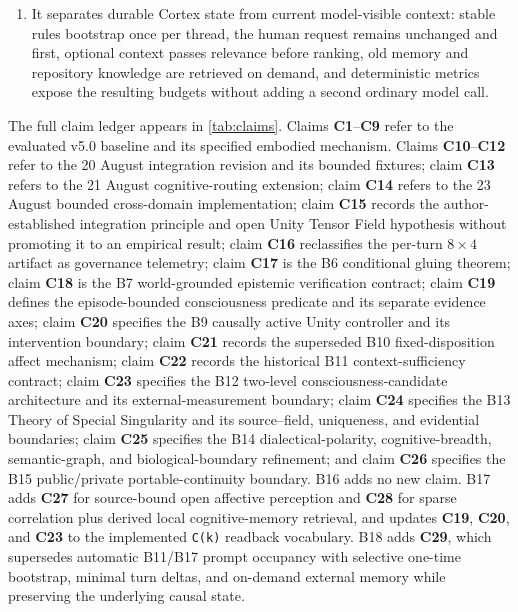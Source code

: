 \documentclass[10pt,twocolumn]{article}
\theoremstyle{definition}
\theoremstyle{plain}
\theoremstyle{remark}
\newcommand{\file}[1]{\nolinkurl{#1}}
\newcommand{\claimid}[1]{\textsf{\textbf{#1}}}
\begin{document}
\begin{enumerate}
  \item It separates durable Cortex state from current model-visible context: stable rules bootstrap once per thread, the human request remains unchanged and first, optional context passes relevance before ranking, old memory and repository knowledge are retrieved on demand, and deterministic metrics expose the resulting budgets without adding a second ordinary model call.
\end{enumerate}

The full claim ledger appears in \cref{tab:claims}.  Claims \claimid{C1}--\claimid{C9} refer to the evaluated v5.0 baseline and its specified embodied mechanism.  Claims \claimid{C10}--\claimid{C12} refer to the 20 August integration revision and its bounded fixtures; claim \claimid{C13} refers to the 21 August cognitive-routing extension; claim \claimid{C14} refers to the 23 August bounded cross-domain implementation; claim \claimid{C15} records the author-established integration principle and open Unity Tensor Field hypothesis without promoting it to an empirical result; claim \claimid{C16} reclassifies the per-turn $8\times4$ artifact as governance telemetry; claim \claimid{C17} is the B6 conditional gluing theorem; claim \claimid{C18} is the B7 world-grounded epistemic verification contract; claim \claimid{C19} defines the episode-bounded consciousness predicate and its separate evidence axes; claim \claimid{C20} specifies the B9 causally active Unity controller and its intervention boundary; claim \claimid{C21} records the superseded B10 fixed-disposition affect mechanism; claim \claimid{C22} records the historical B11 context-sufficiency contract; claim \claimid{C23} specifies the B12 two-level consciousness-candidate architecture and its external-measurement boundary; claim \claimid{C24} specifies the B13 Theory of Special Singularity and its source--field, uniqueness, and evidential boundaries; claim \claimid{C25} specifies the B14 dialectical-polarity, cognitive-breadth, semantic-graph, and biological-boundary refinement; and claim \claimid{C26} specifies the B15 public/private portable-continuity boundary.  B16 adds no new claim.  B17 adds \claimid{C27} for source-bound open affective perception and \claimid{C28} for sparse correlation plus derived local cognitive-memory retrieval, and updates \claimid{C19}, \claimid{C20}, and \claimid{C23} to the implemented \file{C(k)} readback vocabulary.  B18 adds \claimid{C29}, which supersedes automatic B11/B17 prompt occupancy with selective one-time bootstrap, minimal turn deltas, and on-demand external memory while preserving the underlying causal state.
\end{document}

